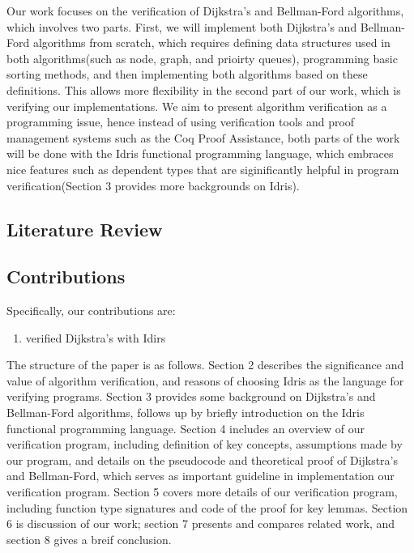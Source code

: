 \documentclass[11pt, a4paper]{article} %
\theoremstyle{definition}
\begin{document}
Our work focuses on the verification of Dijkstra's and Bellman-Ford algorithms, which involves two parts. First, we will implement both Dijkstra's and Bellman-Ford algorithms from scratch, which requires defining data structures used in both algorithms(such as node, graph, and prioirty queues), programming basic sorting methods, and then implementing both algorithms based on these definitions. This allows more flexibility in the second part of our work, which is verifying our implementations. We aim to present algorithm verification as a programming issue, hence instead of using verification tools and proof management systems such as the Coq Proof Assistance, both parts of the work will be done with the Idris functional programming language, which embraces nice features such as dependent types that are siginificantly helpful in program verification(Section 3 provides more backgrounds on Idris).
\\

\subsection*{Literature Review}


\subsection*{Contributions}
Specifically, our contributions are: 
\begin{enumerate}
  \item verified Dijkstra's with Idirs
\end{enumerate}


The structure of the paper is as follows. Section 2 describes the significance and value of algorithm verification, and reasons of choosing Idris as the language for verifying programs. Section 3 provides some background on Dijkstra's and Bellman-Ford algorithms, follows up by briefly introduction on the Idris functional programming language. Section 4 includes an overview of our verification program, including definition of key concepts, assumptions made by our program, and details on the pseudocode and theoretical proof of Dijkstra's and Bellman-Ford, which serves as important guideline in implementation our verification program. Section 5 covers more details of our verification program, including function type signatures and code of the proof for key lemmas. Section 6 is discussion of our work; section 7 presents and compares related work, and section 8 gives a breif conclusion.  
\end{document}
